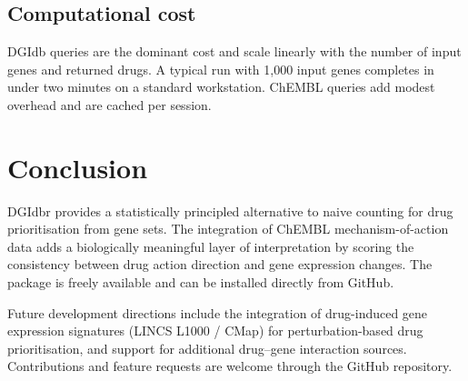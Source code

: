 \documentclass[11pt,a4paper]{article}
\begin{document}
\subsection{Computational cost}

DGIdb queries are the dominant cost and scale linearly with the number of input genes and returned drugs. A typical run with 1,000 input genes completes in under two minutes on a standard workstation. ChEMBL queries add modest overhead and are cached per session.

\section{Conclusion}
\label{sec:conclusion}

DGIdbr provides a statistically principled alternative to naive counting for drug prioritisation from gene sets. The integration of ChEMBL mechanism-of-action data adds a biologically meaningful layer of interpretation by scoring the consistency between drug action direction and gene expression changes. The package is freely available and can be installed directly from GitHub.

Future development directions include the integration of drug-induced gene expression signatures (LINCS L1000 / CMap) for perturbation-based drug prioritisation, and support for additional drug--gene interaction sources. Contributions and feature requests are welcome through the GitHub repository.


\end{document}
